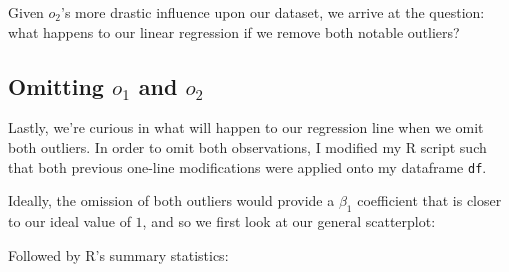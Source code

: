 \documentclass[11pt]{article} %
\begin{document}

Given $o_2$'s more drastic influence upon our dataset, we arrive at the question: what happens to our linear regression if we remove both notable outliers?

\subsection*{Omitting $o_1$ and $o_2$}
Lastly, we're curious in what will happen to our regression line when we omit both outliers. In order to omit both observations, I modified my \textsc{R} script such that both previous one-line modifications were applied onto my dataframe \texttt{df}. \par
Ideally, the omission of both outliers would provide a $\beta_1$ coefficient that is closer to our ideal value of $1$, and so we first look at our general scatterplot:


Followed by \textsc{R}'s summary statistics:
\end{document}
